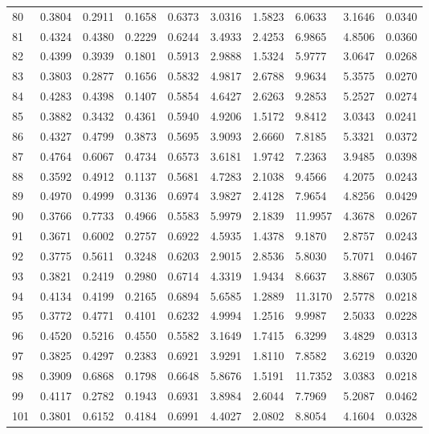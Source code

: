 \begin{longtable}{ p{}  p{}  p{}  p{}  p{} p{}  p{} p{} p{} p{}}
80	&	0.3804	&	0.2911	&	0.1658	&	0.6373	&	3.0316	&	1.5823	&	6.0633	&	3.1646	&	0.0340	\\
81	&	0.4324	&	0.4380	&	0.2229	&	0.6244	&	3.4933	&	2.4253	&	6.9865	&	4.8506	&	0.0360	\\
82	&	0.4399	&	0.3939	&	0.1801	&	0.5913	&	2.9888	&	1.5324	&	5.9777	&	3.0647	&	0.0268	\\
83	&	0.3803	&	0.2877	&	0.1656	&	0.5832	&	4.9817	&	2.6788	&	9.9634	&	5.3575	&	0.0270	\\
84	&	0.4283	&	0.4398	&	0.1407	&	0.5854	&	4.6427	&	2.6263	&	9.2853	&	5.2527	&	0.0274	\\
85	&	0.3882	&	0.3432	&	0.4361	&	0.5940	&	4.9206	&	1.5172	&	9.8412	&	3.0343	&	0.0241	\\
86	&	0.4327	&	0.4799	&	0.3873	&	0.5695	&	3.9093	&	2.6660	&	7.8185	&	5.3321	&	0.0372	\\
87	&	0.4764	&	0.6067	&	0.4734	&	0.6573	&	3.6181	&	1.9742	&	7.2363	&	3.9485	&	0.0398	\\
88	&	0.3592	&	0.4912	&	0.1137	&	0.5681	&	4.7283	&	2.1038	&	9.4566	&	4.2075	&	0.0243	\\
89	&	0.4970	&	0.4999	&	0.3136	&	0.6974	&	3.9827	&	2.4128	&	7.9654	&	4.8256	&	0.0429	\\
90	&	0.3766	&	0.7733	&	0.4966	&	0.5583	&	5.9979	&	2.1839	&	11.9957	&	4.3678	&	0.0267	\\
91	&	0.3671	&	0.6002	&	0.2757	&	0.6922	&	4.5935	&	1.4378	&	9.1870	&	2.8757	&	0.0243	\\
92	&	0.3775	&	0.5611	&	0.3248	&	0.6203	&	2.9015	&	2.8536	&	5.8030	&	5.7071	&	0.0467	\\
93	&	0.3821	&	0.2419	&	0.2980	&	0.6714	&	4.3319	&	1.9434	&	8.6637	&	3.8867	&	0.0305	\\
94	&	0.4134	&	0.4199	&	0.2165	&	0.6894	&	5.6585	&	1.2889	&	11.3170	&	2.5778	&	0.0218	\\
95	&	0.3772	&	0.4771	&	0.4101	&	0.6232	&	4.9994	&	1.2516	&	9.9987	&	2.5033	&	0.0228	\\
96	&	0.4520	&	0.5216	&	0.4550	&	0.5582	&	3.1649	&	1.7415	&	6.3299	&	3.4829	&	0.0313	\\
97	&	0.3825	&	0.4297	&	0.2383	&	0.6921	&	3.9291	&	1.8110	&	7.8582	&	3.6219	&	0.0320	\\
98	&	0.3909	&	0.6868	&	0.1798	&	0.6648	&	5.8676	&	1.5191	&	11.7352	&	3.0383	&	0.0218	\\
99	&	0.4117	&	0.2782	&	0.1943	&	0.6931	&	3.8984	&	2.6044	&	7.7969	&	5.2087	&	0.0462	\\
101	&	0.3801	&	0.6152	&	0.4184	&	0.6991	&	4.4027	&	2.0802	&	8.8054	&	4.1604	&	0.0328	\\

\end{longtable}
